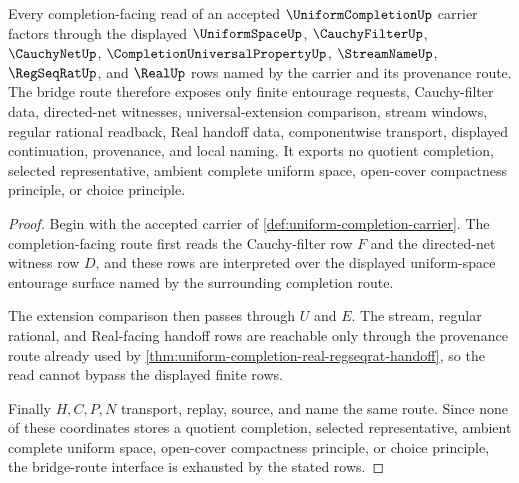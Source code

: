 \begin{theorem}
\label{thm:uniform-completion-bridge-route}
Every completion-facing read of an accepted $\UniformCompletionUp$ carrier factors through the displayed $\UniformSpaceUp$, $\CauchyFilterUp$, $\CauchyNetUp$, $\CompletionUniversalPropertyUp$, $\StreamNameUp$, $\RegSeqRatUp$, and $\RealUp$ rows named by the carrier and its provenance route. The bridge route therefore exposes only finite entourage requests, Cauchy-filter data, directed-net witnesses, universal-extension comparison, stream windows, regular rational readback, Real handoff data, componentwise transport, displayed continuation, provenance, and local naming. It exports no quotient completion, selected representative, ambient complete uniform space, open-cover compactness principle, or choice principle.
\end{theorem}
\begin{proof}
Begin with the accepted carrier of \autoref{def:uniform-completion-carrier}. The completion-facing route first reads the Cauchy-filter row $F$ and the directed-net witness row $D$, and these rows are interpreted over the displayed uniform-space entourage surface named by the surrounding completion route.

The extension comparison then passes through $U$ and $E$. The stream, regular rational, and Real-facing handoff rows are reachable only through the provenance route already used by \autoref{thm:uniform-completion-real-regseqrat-handoff}, so the read cannot bypass the displayed finite rows.

Finally $H,C,P,N$ transport, replay, source, and name the same route. Since none of these coordinates stores a quotient completion, selected representative, ambient complete uniform space, open-cover compactness principle, or choice principle, the bridge-route interface is exhausted by the stated rows.
\end{proof}

